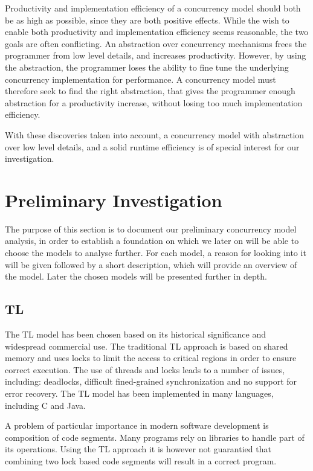 Productivity and implementation efficiency of a concurrency model should both be as high as possible, since they are both positive effects. While the wish to enable both productivity and implementation efficiency seems reasonable, the two goals are often conflicting. An abstraction over concurrency mechanisms frees the programmer from low level details, and increases productivity. However, by using the abstraction, the programmer loses the ability to fine tune the underlying concurrency implementation for performance. A concurrency model must therefore seek to find the right abstraction, that gives the programmer enough abstraction for a productivity increase, without losing too much implementation efficiency.

With these discoveries taken into account, a concurrency model with abstraction over low level details, and a solid runtime efficiency is of special interest for our investigation.

\section{Preliminary Investigation}\label{sec:prelim}
The purpose of this section is to document our preliminary concurrency model analysis, in order to establish a foundation on which we later on will be able to choose the models to analyse further. For each model, a reason for looking into it will be given followed by a short description, which will provide an overview of the model. Later the chosen models will be presented further in depth.

\subsection{\acl{TL}}
\label{subsec:tl}
The \ac{TL} model has been chosen based on its historical significance and widespread commercial use\cite[p. 58]{sutter2005software}. The traditional \ac{TL} approach is based on shared memory and uses locks to limit the access to critical regions in order to ensure correct execution\cite[p. 1]{saha2006mcrt}. The use of threads and locks leads to a number of issues, including: deadlocks, difficult fined-grained synchronization and no support for error recovery\cite[p. 187]{saha2006mcrt}. The \ac{TL} model has been implemented in many languages, including C and Java. 

A problem of particular importance in modern software development is composition of code segments. Many programs rely on libraries to handle part of its operations. Using the \ac{TL} approach it is however not guarantied that combining two lock based code segments will result in a correct program\cite[p. 56]{sutter2005software}.

